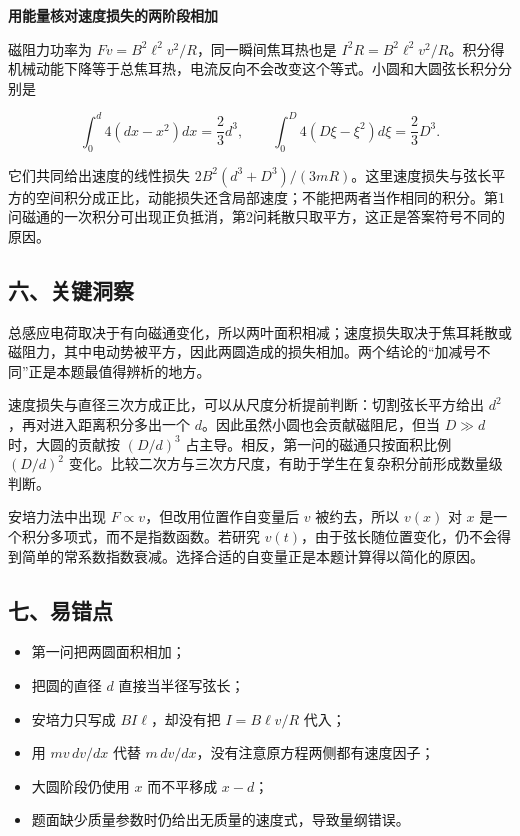 \documentclass[12pt,a4paper,UTF8]{ctexart}
\newcommand{\tightlist}{\setlength{\itemsep}{0pt}\setlength{\parskip}{0pt}}
\begin{document}
\textbf{用能量核对速度损失的两阶段相加}

磁阻力功率为 \(Fv=B^2\ell^2v^2/R\)，同一瞬间焦耳热也是
\(I^2R=B^2\ell^2v^2/R\)。积分得机械动能下降等于总焦耳热，电流反向不会改变这个等式。小圆和大圆弦长积分分别是

\[\int_0^d4(dx-x^2)dx=\frac23d^3,\qquad \int_0^D4(D\xi-\xi^2)d\xi=\frac23D^3.\]

它们共同给出速度的线性损失
\(2B^2(d^3+D^3)/(3mR)\)。这里速度损失与弦长平方的空间积分成正比，动能损失还含局部速度；不能把两者当作相同的积分。第1问磁通的一次积分可出现正负抵消，第2问耗散只取平方，这正是答案符号不同的原因。

\subsection{六、关键洞察}\label{ux516dux5173ux952eux6d1eux5bdf-3}

总感应电荷取决于有向磁通变化，所以两叶面积相减；速度损失取决于焦耳耗散或磁阻力，其中电动势被平方，因此两圆造成的损失相加。两个结论的``加减号不同''正是本题最值得辨析的地方。

速度损失与直径三次方成正比，可以从尺度分析提前判断：切割弦长平方给出
\(d^2\)，再对进入距离积分多出一个
\(d\)。因此虽然小圆也会贡献磁阻尼，但当 \(D\gg d\) 时，大圆的贡献按
\((D/d)^3\) 占主导。相反，第一问的磁通只按面积比例 \((D/d)^2\)
变化。比较二次方与三次方尺度，有助于学生在复杂积分前形成数量级判断。

安培力法中出现 \(F\propto v\)，但改用位置作自变量后 \(v\) 被约去，所以
\(v(x)\) 对 \(x\) 是一个积分多项式，而不是指数函数。若研究
\(v(t)\)，由于弦长随位置变化，仍不会得到简单的常系数指数衰减。选择合适的自变量正是本题计算得以简化的原因。

\subsection{七、易错点}\label{ux4e03ux6613ux9519ux70b9-3}

\begin{itemize}
\tightlist
\item
  第一问把两圆面积相加；
\item
  把圆的直径 \(d\) 直接当半径写弦长；
\item
  安培力只写成 \(BI\ell\)，却没有把 \(I=B\ell v/R\) 代入；
\item
  用 \(m v\,dv/dx\) 代替 \(m\,dv/dx\)，没有注意原方程两侧都有速度因子；
\item
  大圆阶段仍使用 \(x\) 而不平移成 \(x-d\)；
\item
  题面缺少质量参数时仍给出无质量的速度式，导致量纲错误。
\end{itemize}
\end{document}
